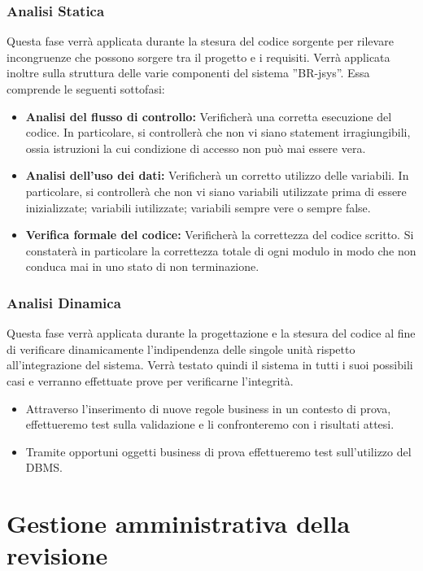 \documentclass[11pt,titlepage,a4paper]{report}
\begin{document}
\subsection{Analisi Statica}
Questa fase verr\`a applicata durante la stesura del codice sorgente per rilevare incongruenze che possono sorgere tra il progetto e i requisiti. Verr\`a applicata inoltre sulla struttura delle varie componenti del sistema ''BR-jsys''. Essa comprende le seguenti sottofasi:
\begin{itemize}
\item \textbf{Analisi del flusso di controllo:} Verificher\`a una corretta esecuzione del codice.
In particolare, si controller\`a che non vi siano statement irragiungibili, ossia istruzioni la cui condizione di accesso non pu\`o mai essere vera.
\item \textbf{Analisi dell'uso dei dati:} Verificher\`a un corretto utilizzo delle variabili.
In particolare, si controller\`a che non vi siano variabili utilizzate prima di essere inizializzate; variabili iutilizzate; variabili sempre vere o sempre false.
\item \textbf{Verifica formale del codice:} Verificher\`a la correttezza del codice scritto. Si constater\`a in particolare la correttezza totale di ogni modulo in modo che non conduca mai in uno stato di non terminazione.
\end{itemize}

\subsection{Analisi Dinamica}
Questa fase verr\`a applicata durante la progettazione e la stesura del codice al fine di verificare dinamicamente l'indipendenza delle singole unit\`a rispetto all'integrazione del sistema. Verr\`a testato quindi il sistema in tutti i suoi possibili casi e verranno effettuate prove per verificarne l'integrit\`a.
\begin{itemize}
\item Attraverso l'inserimento di nuove regole business in un contesto di prova, effettueremo test sulla validazione e li confronteremo con i risultati attesi.
\item Tramite opportuni oggetti business di prova effettueremo test sull'utilizzo del DBMS.
\end{itemize}

\chapter[Gestione revisione]{Gestione amministrativa della revisione} 
\end{document}

